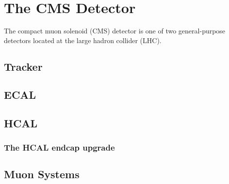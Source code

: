 \chapter{The CMS Detector}
\label{detector}

The compact muon solenoid (CMS) detector is one of two general-purpose detectors located at the large hadron collider (LHC).

\section{Tracker}

\section{ECAL}

\section{HCAL}

\subsection{The HCAL endcap upgrade}

\section{Muon Systems}